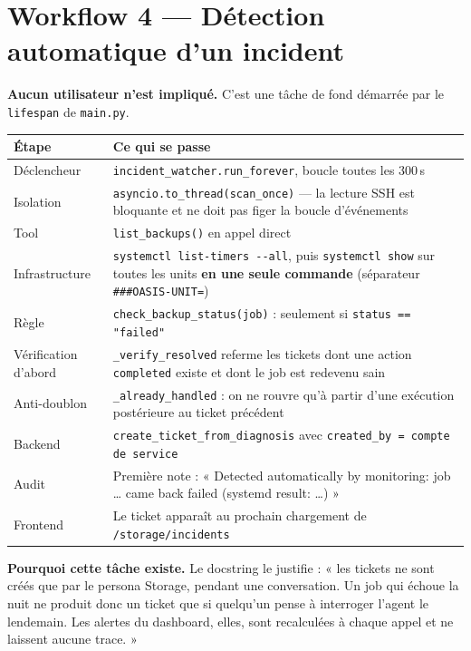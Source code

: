 \documentclass[11pt,a4paper]{report}
\newcommand{\file}[1]{\texttt{\small #1}}
\newcommand{\fn}[1]{\texttt{\small\textcolor{oasisviolet}{#1}}}
\newcommand{\route}[1]{\texttt{\small\textcolor{oasisgreen}{#1}}}
\begin{document}
\section{Workflow 4 --- Détection automatique d'un incident}

\textbf{Aucun utilisateur n'est impliqué.} C'est une tâche de fond démarrée par
le \fn{lifespan} de \file{main.py}.

\begin{longtable}{@{}p{2.9cm}p{11.9cm}@{}}
\toprule
\textbf{Étape} & \textbf{Ce qui se passe}\\
\midrule
\endhead
Déclencheur & \fn{incident\_watcher.run\_forever}, boucle toutes les 300\,s\\
Isolation & \fn{asyncio.to\_thread(scan\_once)} --- la lecture SSH est bloquante et ne doit pas figer la boucle d'événements\\
Tool & \fn{list\_backups()} en appel direct\\
Infrastructure & \texttt{systemctl list-timers -{}-all}, puis \texttt{systemctl show} sur toutes les units \textbf{en une seule commande} (séparateur \texttt{\#\#\#OASIS-UNIT=})\\
Règle & \fn{check\_backup\_status(job)} : seulement si \texttt{status == "failed"}\\
Vérification d'abord & \fn{\_verify\_resolved} referme les tickets dont une action \texttt{completed} existe et dont le job est redevenu sain\\
Anti-doublon & \fn{\_already\_handled} : on ne rouvre qu'à partir d'une exécution postérieure au ticket précédent\\
Backend & \fn{create\_ticket\_from\_diagnosis} avec \texttt{created\_by = compte de service}\\
Audit & Première note : « Detected automatically by monitoring: job \ldots{} came back failed (systemd result: \ldots) »\\
Frontend & Le ticket apparaît au prochain chargement de \route{/storage/incidents}\\
\bottomrule
\end{longtable}

\begin{infobox}
\textbf{Pourquoi cette tâche existe.} Le docstring le justifie : « les tickets ne
sont créés que par le persona Storage, pendant une conversation. Un job qui
échoue la nuit ne produit donc un ticket que si quelqu'un pense à interroger
l'agent le lendemain. Les alertes du dashboard, elles, sont recalculées à chaque
appel et ne laissent aucune trace. »
\end{infobox}
\end{document}
